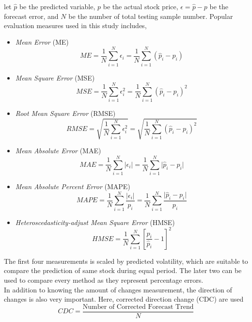 let $ \hat{p} $ be the predicted variable, $ p $ be the actual stock price, $ \epsilon = \hat{p} - p $ be the forecast error, and $ N $ be the number of total testing sample number. Popular evaluation measures used in this study includes\cite{poon2005practical},
\begin{itemize}
	\item \textit{Mean Error} (ME)
	\begin{equation}
	ME=\frac{1}{N} \sum_{i=1}^{N}\epsilon_i=\frac{1}{N} \sum_{i=1}^{N} (\hat{p}_i - p_i)
	\end{equation}
	
	\item \textit{Mean Square Error} (MSE)
	\begin{equation}
	MSE = \frac{1}{N} \sum_{i=1}^{N}\epsilon_i^2=\frac{1}{N} \sum_{i=1}^{N} (\hat{p}_i - p_i)^2
	\end{equation}
	
	\item \textit{Root Mean Square Error} (RMSE)
	\begin{equation}
	RMSE = \sqrt{\frac{1}{N} \sum_{i=1}^{N}\epsilon_i^2}=\sqrt{\frac{1}{N} \sum_{i=1}^{N} (\hat{p}_i - p_i)^2}
	\end{equation}
	
	\item \textit{Mean Absolute Error} (MAE)
	\begin{equation}
	MAE=\frac{1}{N} \sum_{i=1}^{N} \lvert \epsilon_i \rvert =\frac{1}{N} \sum_{i=1}^{N} \lvert \hat{p}_i - p_i \rvert
	\end{equation}
	
	\item \textit{Mean Absolute Percent Error} (MAPE)
	\begin{equation}
	MAPE=\frac{1}{N} \sum_{i=1}^{N} \frac{\lvert \epsilon_i \rvert}{p_i} =\frac{1}{N} \sum_{i=1}^{N} \frac{\lvert \hat{p}_i - p_i \rvert}{p_i}
	\end{equation}
	
	\item \textit{Heteroscedasticity-adjust Mean Square Error} (HMSE)
	\begin{equation}
	HMSE=\frac{1}{N} \sum_{i=1}^{N}[\frac{p_i}{\hat{p}_i}- 1]^2
	\end{equation}
\end{itemize}
The first four measurements is scaled by predicted volatility, which are suitable to compare the prediction of same stock during equal period. The later two can be used to compare every method as they represent percentage errors.\\


In addition to knowing the amount of changes measurement, the direction of changes is also very important. Here, corrected direction change (CDC)\cite{naeini2010stock} are used
\begin{equation}
CDC = \frac{\text{Number of Corrected Forecast Trend}}{N}
\end{equation}